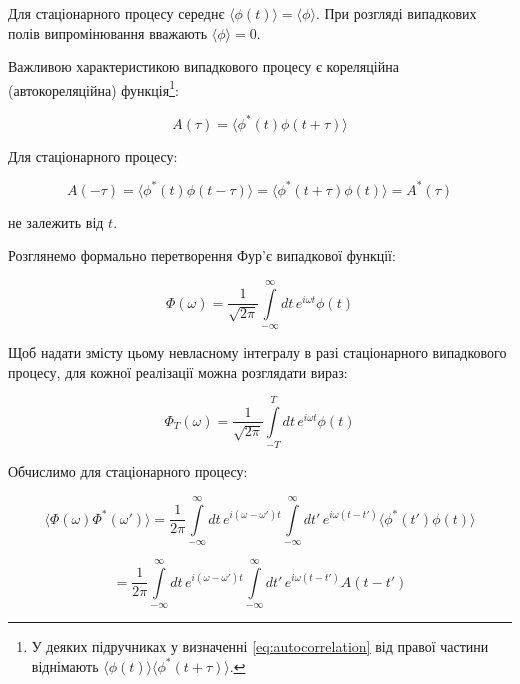 Для стаціонарного процесу середнє \(\langle \phi(t) \rangle = \langle \phi \rangle\). При розгляді випадкових полів випромінювання вважають \(\langle
\phi \rangle = 0\).

Важливою характеристикою випадкового процесу є кореляційна (автокореляційна) функція\footnote{У деяких підручниках у визначенні
\eqref{eq:autocorrelation} від правої частини віднімають \(\langle \phi(t) \rangle \langle \phi^{*}(t + \tau) \rangle\).}:

\begin{equation}
A(\tau) = \langle \phi^{*}(t) \phi(t + \tau) \rangle
\label{eq:autocorrelation}
\end{equation}

Для стаціонарного процесу:

\begin{equation*}
A(-\tau) = \langle \phi^{*}(t) \phi(t - \tau) \rangle = \langle \phi^{*}(t + \tau) \phi(t) \rangle = A^{*}(\tau)
\end{equation*}

не залежить від \(t\).

Розглянемо формально перетворення Фур'є випадкової функції:

\begin{equation*}
\Phi(\omega) = \frac{1}{\sqrt{2\pi}} \int\limits_{-\infty}^{\infty} dt \, e^{i\omega t} \phi(t)
\end{equation*}

Щоб надати змісту цьому невласному інтегралу в разі стаціонарного випадкового процесу, для кожної реалізації можна розглядати вираз:

\begin{equation*}
\Phi_T(\omega) = \frac{1}{\sqrt{2\pi}} \int\limits_{-T}^{T} dt \, e^{i\omega t} \phi(t)
\end{equation*}

Обчислимо для стаціонарного процесу:

\begin{equation*}
\langle \Phi(\omega) \Phi^{*}(\omega') \rangle = \frac{1}{2\pi} \int\limits_{-\infty}^{\infty} dt \, e^{i(\omega - \omega')t}
\int\limits_{-\infty}^{\infty} dt' \,
e^{i\omega(t - t')} \langle \phi^{*}(t') \phi(t) \rangle
\end{equation*}

\begin{equation*}
= \frac{1}{2\pi} \int\limits_{-\infty}^{\infty} dt \, e^{i(\omega - \omega')t} \int\limits_{-\infty}^{\infty} dt' \, e^{i\omega(t - t')} A(t - t')
\end{equation*}

